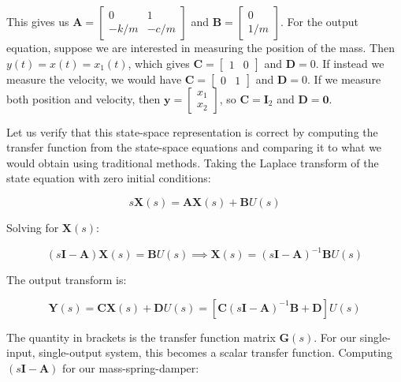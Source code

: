 This gives us $\mathbf{A} = \begin{bmatrix} 0 & 1 \\ -k/m & -c/m \end{bmatrix}$ and $\mathbf{B} = \begin{bmatrix} 0 \\ 1/m \end{bmatrix}$. For the output equation, suppose we are interested in measuring the position of the mass. Then $y(t) = x(t) = x_1(t)$, which gives $\mathbf{C} = \begin{bmatrix} 1 & 0 \end{bmatrix}$ and $\mathbf{D} = 0$. If instead we measure the velocity, we would have $\mathbf{C} = \begin{bmatrix} 0 & 1 \end{bmatrix}$ and $\mathbf{D} = 0$. If we measure both position and velocity, then $\mathbf{y} = \begin{bmatrix} x_1 \\ x_2 \end{bmatrix}$, so $\mathbf{C} = \mathbf{I}_2$ and $\mathbf{D} = \mathbf{0}$.

Let us verify that this state-space representation is correct by computing the transfer function from the state-space equations and comparing it to what we would obtain using traditional methods. Taking the Laplace transform of the state equation with zero initial conditions:

\begin{equation}
s\mathbf{X}(s) = \mathbf{A}\mathbf{X}(s) + \mathbf{B}U(s)
\end{equation}

Solving for $\mathbf{X}(s)$:

\begin{equation}
(s\mathbf{I} - \mathbf{A})\mathbf{X}(s) = \mathbf{B}U(s) \implies \mathbf{X}(s) = (s\mathbf{I} - \mathbf{A})^{-1}\mathbf{B}U(s)
\end{equation}

The output transform is:

\begin{equation}
\mathbf{Y}(s) = \mathbf{C}\mathbf{X}(s) + \mathbf{D}U(s) = \left[\mathbf{C}(s\mathbf{I} - \mathbf{A})^{-1}\mathbf{B} + \mathbf{D}\right]U(s)
\end{equation}

The quantity in brackets is the transfer function matrix $\mathbf{G}(s)$. For our single-input, single-output system, this becomes a scalar transfer function. Computing $(s\mathbf{I} - \mathbf{A})$ for our mass-spring-damper:

